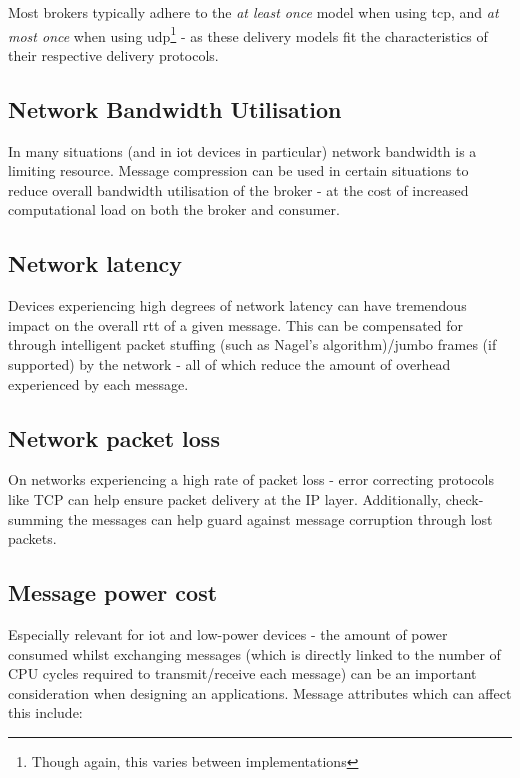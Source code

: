 Most brokers typically adhere to the \textit{at least once} model when using
\gls{tcp}, and \textit{at most once} when using \gls{udp}\footnote{Though again,
this varies between implementations} - as these delivery models fit the
characteristics of their respective delivery protocols.

\subsection{Network Bandwidth Utilisation}
\label{sub:Network Bandwidth Utilization}

In many situations (and in \gls{iot} devices in particular) network bandwidth is
a limiting resource. Message compression can be used in certain situations to
reduce overall bandwidth utilisation of the broker - at the cost of increased
computational load on both the broker and consumer.

\subsection{Network latency}
\label{sub:Network latency}

Devices experiencing high degrees of network latency can have tremendous impact
on the overall \gls{rtt} of a given message. This can be compensated for through
intelligent packet stuffing (such as Nagel's algorithm)/jumbo frames (if
supported) by the network - all of which reduce the amount of overhead
experienced by each message.

\subsection{Network packet loss}
\label{sub:Network packet loss}

On networks experiencing a high rate of packet loss - error correcting protocols
like TCP can help ensure packet delivery at the IP layer. Additionally,
check-summing the messages can help guard against message corruption through
lost packets.

\subsection{Message power cost}
\label{sub:Message power cost}

Especially relevant for \gls{iot} and low-power devices - the amount of power
consumed whilst exchanging messages (which is directly linked to the number of
CPU cycles required to transmit/receive each message) can be an important
consideration when designing an applications. Message attributes which can
affect this include:

